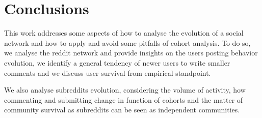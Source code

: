 \section{Conclusions}

This work addresses some aspects of how to analyse the evolution of a social network and how to apply and avoid some pitfalls of cohort analysis. To do so, we analyse the reddit network and provide insights on the users posting behavior evolution, we identify a general tendency of newer users to write smaller comments and we discuss user survival from empirical standpoint. 

We also analyse subreddits evolution, considering the volume of activity, how commenting and submitting change in function of cohorts and the matter of community survival as subreddits can be seen as independent communities.
